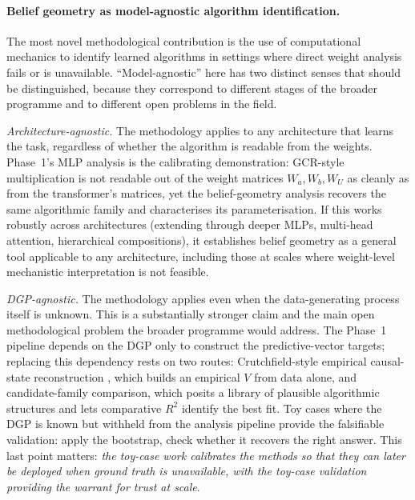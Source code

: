 \documentclass[11pt,a4paper]{article}
\begin{document}
\paragraph{Belief geometry as model-agnostic algorithm identification.} The most novel methodological contribution is the use of computational mechanics to identify learned algorithms in settings where direct weight analysis fails or is unavailable. ``Model-agnostic'' here has two distinct senses that should be distinguished, because they correspond to different stages of the broader programme and to different open problems in the field.

\emph{Architecture-agnostic.} The methodology applies to any architecture that learns the task, regardless of whether the algorithm is readable from the weights. Phase~1's MLP analysis is the calibrating demonstration: GCR-style multiplication is not readable out of the weight matrices $W_a, W_b, W_U$ as cleanly as from the transformer's matrices, yet the belief-geometry analysis recovers the same algorithmic family and characterises its parameterisation. If this works robustly across architectures (extending through deeper MLPs, multi-head attention, hierarchical compositions), it establishes belief geometry as a general tool applicable to any architecture, including those at scales where weight-level mechanistic interpretation is not feasible.

\emph{DGP-agnostic.} The methodology applies even when the data-generating process itself is unknown. This is a substantially stronger claim and the main open methodological problem the broader programme would address. The Phase~1 pipeline depends on the DGP only to construct the predictive-vector targets; replacing this dependency rests on two routes: Crutchfield-style empirical causal-state reconstruction \citep{shalizi2004cssr}, which builds an empirical $V$ from data alone, and candidate-family comparison, which posits a library of plausible algorithmic structures and lets comparative $R^2$ identify the best fit. Toy cases where the DGP is known but withheld from the analysis pipeline provide the falsifiable validation: apply the bootstrap, check whether it recovers the right answer. This last point matters: \emph{the toy-case work calibrates the methods so that they can later be deployed when ground truth is unavailable, with the toy-case validation providing the warrant for trust at scale}.
\end{document}
